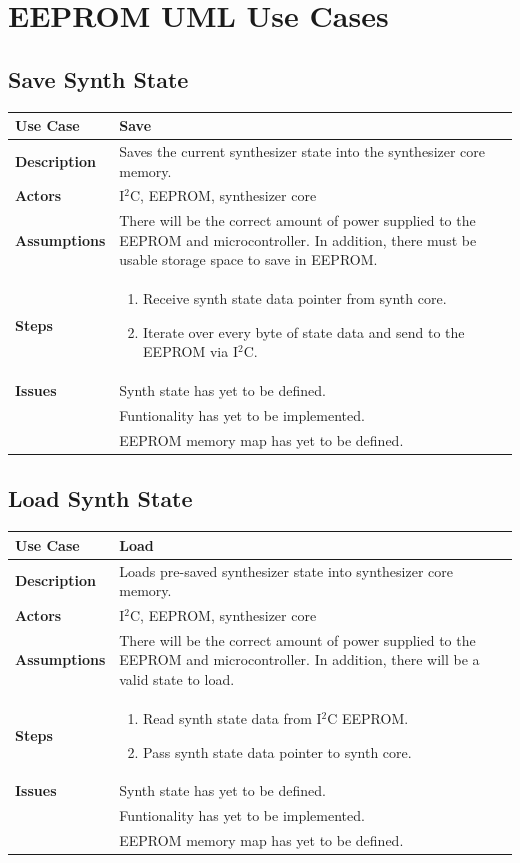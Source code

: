 \documentclass{article}
\begin{document}
\section{EEPROM UML Use Cases}

\subsection{Save Synth State}
\begin{tabular}{|p{1in}|p{5in}|}
\hline
\textbf{Use Case} & Save\\
\hline
\textbf{Description} & Saves the current synthesizer state into the synthesizer core memory.\\
\hline
\textbf{Actors} & I$^2$C, EEPROM, synthesizer core\\
\hline
\textbf{Assumptions} & There will be the correct amount of power supplied to the EEPROM and microcontroller.  In addition, there must be usable storage space to save in EEPROM.\\
\hline
\textbf{Steps} & \begin{enumerate}
\item Receive synth state data pointer from synth core.
\item Iterate over every byte of state data and send to the EEPROM via I$^2$C.
\end{enumerate}\\
\hline
\textbf{Issues} & Synth state has yet to be defined.\\
& Funtionality has yet to be implemented.\\
& EEPROM memory map has yet to be defined.\\
\hline
\end{tabular}

\subsection{Load Synth State}
\begin{tabular}{|p{1in}|p{5in}|}
\hline
\textbf{Use Case} & Load\\
\hline
\textbf{Description} & Loads pre-saved synthesizer state into synthesizer core memory.\\
\hline
\textbf{Actors} & I$^{2}$C, EEPROM, synthesizer core\\
\hline
\textbf{Assumptions} & There will be the correct amount of power supplied to the EEPROM and microcontroller.  In addition, there will be a valid state to load.\\
\hline
\textbf{Steps} & \begin{enumerate}
\item Read synth state data from I$^2$C EEPROM.
\item Pass synth state data pointer to synth core.
\end{enumerate}\\
\hline
\textbf{Issues} & Synth state has yet to be defined.\\
& Funtionality has yet to be implemented.\\
& EEPROM memory map has yet to be defined.\\
\hline
\end{tabular}
\end{document}
